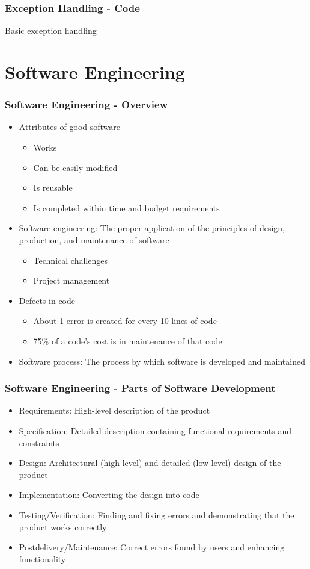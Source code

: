 \documentclass[c, aspectratio=169]{beamer}
\begin{document}
\begin{frame}\frametitle{Exception Handling - Code}
Basic exception handling

\end{frame}

\section{Software Engineering}
\begin{frame}\frametitle{Software Engineering - Overview}
\begin{itemize}
\item Attributes of good software
	\begin{itemize}
	\item Works
	\item Can be easily modified
	\item Is reusable
	\item Is completed within time and budget requirements
	\end{itemize}
\item Software engineering: The proper application of the principles of design, production, and maintenance of software
	\begin{itemize}
	\item Technical challenges
	\item Project management
	\end{itemize}
\item Defects in code
	\begin{itemize}
	\item About 1 error is created for every 10 lines of code
	\item 75\% of a code's cost is in maintenance of that code
	\end{itemize}
\item Software process: The process by which software is developed and maintained
\end{itemize}
\end{frame}

\begin{frame}\frametitle{Software Engineering - Parts of Software Development}
\begin{itemize}
\item Requirements: High-level description of the product
\item Specification: Detailed description containing functional requirements and constraints
\item Design: Architectural (high-level) and detailed (low-level) design of the product
\item Implementation: Converting the design into code
\item Testing/Verification: Finding and fixing errors and demonstrating that the product works correctly
\item Postdelivery/Maintenance: Correct errors found by users and enhancing functionality
\end{itemize}
\end{frame}
\end{document}

